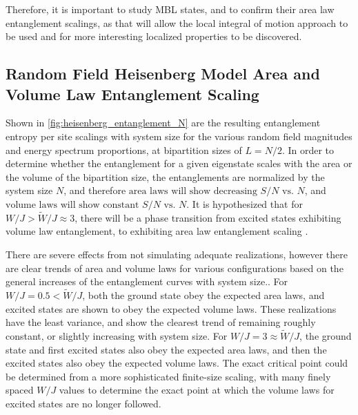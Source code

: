 \documentclass[12pt]{article}{}
\begin{document}
Therefore, it is important to study MBL states, and to confirm their area law entanglement scalings, as that will allow the local integral of motion approach to be used and for more interesting localized properties to be discovered.

\subsection{Random Field Heisenberg Model Area and Volume Law Entanglement Scaling}
Shown in \cref{fig:heisenberg_entanglement_N} are the resulting entanglement entropy per site scalings with system size for the various random field magnitudes and energy spectrum proportions, at bipartition sizes of $L = N/2$. In order to determine whether the entanglement for a given eigenstate scales with the area or the volume of the bipartition size, the entanglements are normalized by the system size $N$, and therefore $\boxed{\textrm{area laws will show decreasing } S/N \textrm{ vs. } N}$, and $\boxed{\textrm{volume laws will show constant } S/N \textrm{ vs. } N}$. It is hypothesized that for $W/J > \tilde{W}/J \approx 3$, there will be a phase transition from excited states exhibiting volume law entanglement, to exhibiting area law entanglement scaling \cite{Abanin2018}.

There are severe effects from not simulating adequate realizations, however there are clear trends of area and volume laws for various configurations based on the general increases of the entanglement curves with system size.. For $W/J = 0.5 < \tilde{W}/J$, both the ground state obey the expected area laws, and excited states are shown to obey the expected volume laws. These realizations have the least variance, and show the clearest trend of remaining roughly constant, or slightly increasing with system size. For $W/J = 3 \approx \tilde{W}/J$, the ground state and first excited states also obey the expected area laws, and then the excited states also obey the expected volume laws. The exact critical point could be determined from a more sophisticated finite-size scaling, with many finely spaced $W/J$ values to determine the exact point at which the volume laws for excited states are no longer followed.
\end{document}
